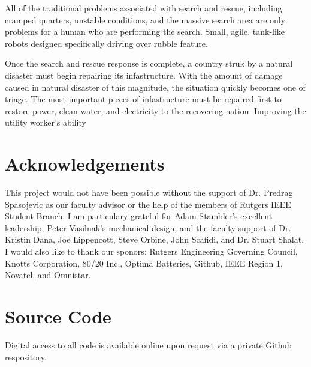 \documentclass[11pt,twocolumn]{article}
\begin{document}
All of the traditional problems associated with search and rescue, including
cramped quarters, unstable conditions, and the massive search area are only
problems for a human who are performing the search. Small, agile, tank-like
robots designed specifically driving over rubble feature. %

Once the search and rescue response is complete, a country struk by a natural
disaster must begin repairing its infastructure. With the amount of damage
caused in natural disaster of this magnitude, the situation quickly becomes one
of triage. The most important pieces of infastructure must be repaired first to
restore power, clean water, and electricity to the recovering nation. Improving
the utility worker's ability 





\section{Acknowledgements}
This project would not have been possible without the support of Dr. Predrag
Spasojevic as our faculty advisor or the help of the members of Rutgers IEEE
Student Branch. I am particulary grateful for Adam Stambler's excellent
leadership, Peter Vasilnak's mechanical design, and the faculty support of Dr.
Kristin Dana, Joe Lippencott, Steve Orbine, John Scafidi, and Dr. Stuart
Shalat. I would also like to thank our sponors: Rutgers Engineering Governing
Council, Knotts Corporation, 80/20 Inc., Optima Batteries, Github, IEEE Region
1, Novatel, and Omnistar.

\appendix
\section{Source Code}
Digital access to all code is available online upon request via a private
Github respository.

\end{document}
